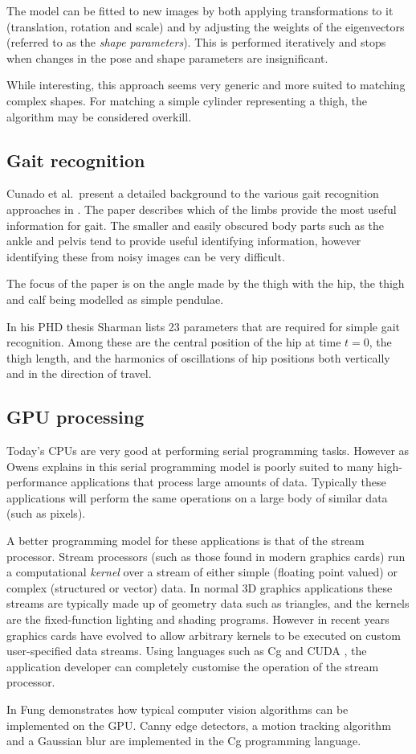 The model can be fitted to new images by both applying transformations to it (translation, rotation and scale) and by adjusting the weights of the eigenvectors (referred to as the \emph{shape parameters}).
This is performed iteratively and stops when changes in the pose and shape parameters are insignificant.

While interesting, this approach seems very generic and more suited to matching complex shapes.
For matching a simple cylinder representing a thigh, the algorithm may be considered overkill.

\subsection{Gait recognition}

Cunado et al.\ present a detailed background to the various gait recognition approaches in \cite{GaitModels}.
The paper describes which of the limbs provide the most useful information for gait.
The smaller and easily obscured body parts such as the ankle and pelvis tend to provide useful identifying information, however identifying these from noisy images can be very difficult.

The focus of the paper is on the angle made by the thigh with the hip, the thigh and calf being modelled as simple pendulae.

\bigskip
\noindent In his PHD thesis \cite{KarlSharman} Sharman lists 23 parameters that are required for simple gait recognition.
Among these are the central position of the hip at time $t = 0$, the thigh length, and the harmonics of oscillations of hip positions both vertically and in the direction of travel.


\subsection{GPU processing}

Today's CPUs are very good at performing serial programming tasks.
However as Owens explains in \cite{GemsStreams} this serial programming model is poorly suited to many high-performance applications that process large amounts of data.
Typically these applications will perform the same operations on a large body of similar data (such as pixels).

A better programming model for these applications is that of the stream processor.
Stream processors (such as those found in modern graphics cards) run a computational \emph{kernel} over a stream of either simple (floating point valued) or complex (structured or vector) data.
In normal 3D graphics applications these streams are typically made up of geometry data such as triangles, and the kernels are the fixed-function lighting and shading programs.
However in recent years graphics cards have evolved to allow arbitrary kernels to be executed on custom user-specified data streams.
Using languages such as Cg \cite{CgToolkit} and CUDA \cite{CudaToolkit}, the application developer can completely customise the operation of the stream processor.

\bigskip
\noindent In \cite{GemsVision} Fung demonstrates how typical computer vision algorithms can be implemented on the GPU.
Canny edge detectors, a motion tracking algorithm and a Gaussian blur are implemented in the Cg programming language.